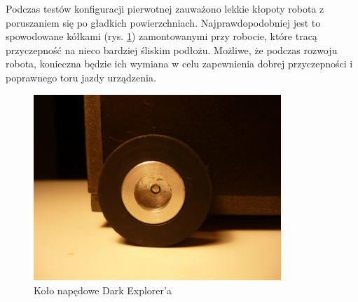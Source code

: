 Podczas testów konfiguracji pierwotnej zauważono lekkie kłopoty robota z
poruszaniem się po gładkich powierzchniach. Najprawdopodobniej jest to
spowodowane kółkami (rys. \ref{fig:KmakWheel}) zamontowanymi przy robocie, które
tracą przyczepność na nieco bardziej śliskim podłożu. Możliwe, że podczas rozwoju
robota, konieczna będzie ich wymiana w celu zapewnienia dobrej przyczepności i
poprawnego toru jazdy urządzenia.

\begin{figure}[!ht]
 \centering
 \includegraphics[height=70mm]{../images/ch02/wheel.jpg}
 \caption{Koło napędowe Dark Explorer'a}
 \label{fig:KmakWheel}
\end{figure}